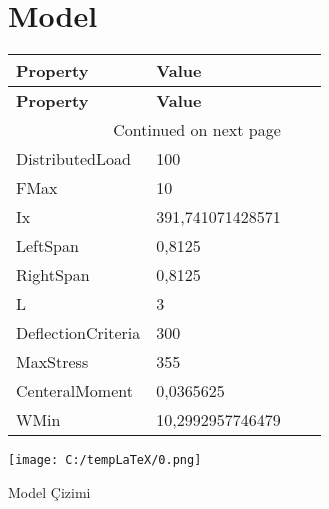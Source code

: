 \documentclass[12pt]{article}
\newenvironment{Figure} 
{\par\medskip\noindent\minipage{\linewidth}} 
{\endminipage\par\medskip}
\begin{document}
\section{Model}
\begin{longtable}{|*{2}{l|l|}} 
\hline 
\textbf{Property} & 
\textbf{Value} 
 \\ \hline 
\endfirsthead 
\hline 
\textbf{Property} & \textbf{Value}\\ \hline 
\endhead 
\hline 
\multicolumn{2}{|r|}{{Continued on next page}} \\ \hline 
\endfoot 
\endlastfoot 
\hline 
DistributedLoad & 100 \\ 
\hline 
FMax & 10 \\ 
\hline 
Ix & 391,741071428571 \\ 
\hline 
LeftSpan & 0,8125 \\ 
\hline 
RightSpan & 0,8125 \\ 
\hline 
L & 3 \\ 
\hline 
DeflectionCriteria & 300 \\ 
\hline 
MaxStress & 355 \\ 
\hline 
CenteralMoment & 0,0365625 \\ 
\hline 
WMin & 10,2992957746479 \\ 
\hline 
\end{longtable} 
\begin{Figure} 
\texttt{[image: C:/tempLaTeX/0.png]} 
\caption{Model Çizimi} 
\label{} 
\end{Figure} 
\end{document}

